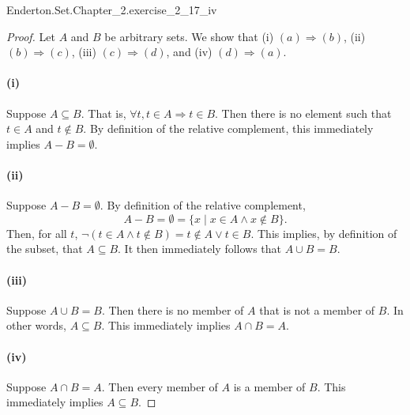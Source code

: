 \documentclass{report}
\begin{document}
    {Enderton.Set.Chapter\_2.exercise\_2\_17\_iv}

  \begin{proof}
    Let $A$ and $B$ be arbitrary sets.
    We show that (i) $(a) \Rightarrow (b)$, (ii) $(b) \Rightarrow (c)$, (iii)
      $(c) \Rightarrow (d)$, and (iv) $(d) \Rightarrow (a)$.

    \paragraph{(i)}%

      Suppose $A \subseteq B$.
      That is, $\forall t, t \in A \Rightarrow t \in B$.
      Then there is no element such that $t \in A$ and $t \not\in B$.
      By definition of the relative complement, this immediately implies
        $A - B = \emptyset$.

    \paragraph{(ii)}%

      Suppose $A - B = \emptyset$.
      By definition of the relative complement,
        $$A - B = \emptyset = \{ x \mid x \in A \land x \not\in B \}.$$
      Then, for all $t$,
        $\neg(t \in A \land t \not\in B) = t \not\in A \lor t \in B$.
      This implies, by definition of the subset, that $A \subseteq B$.
      It then immediately follows that $A \cup B = B$.

    \paragraph{(iii)}%

      Suppose $A \cup B = B$.
      Then there is no member of $A$ that is not a member of $B$.
      In other words, $A \subseteq B$.
      This immediately implies $A \cap B = A$.

    \paragraph{(iv)}%

      Suppose $A \cap B = A$.
      Then every member of $A$ is a member of $B$.
      This immediately implies $A \subseteq B$.

  \end{proof}

\subsection{}%
\end{document}
